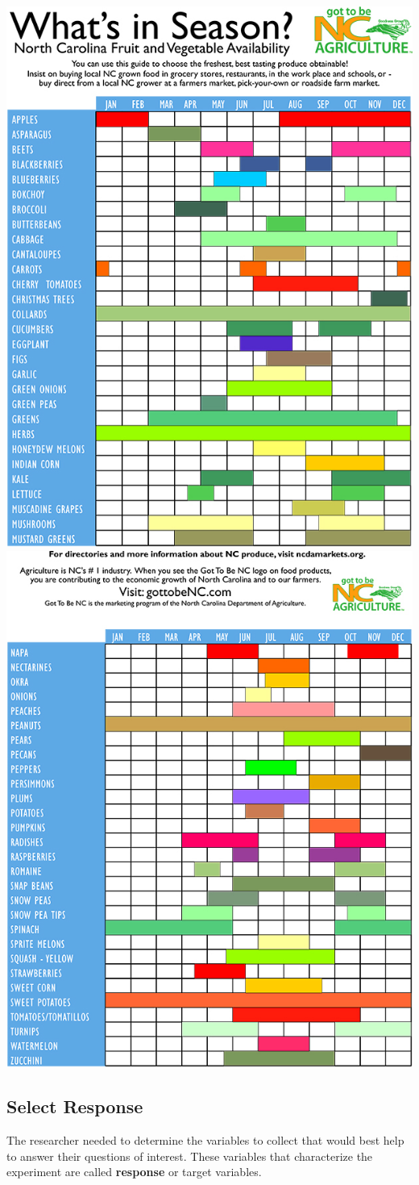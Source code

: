 \documentclass[
]{book}
\theoremstyle{definition}
\theoremstyle{definition}
\theoremstyle{definition}
\theoremstyle{remark}
\begin{document}
\includegraphics[width=0.65\linewidth]{img/availabilitychart-1}
\includegraphics[width=0.65\linewidth]{img/availabilitychart-2}

\hypertarget{select-response}{%
\subsection{Select Response}\label{select-response}}

The researcher needed to determine the variables to collect that would best help to answer their questions of interest. These variables that characterize the experiment are called \textbf{response} or target variables.
\end{document}
